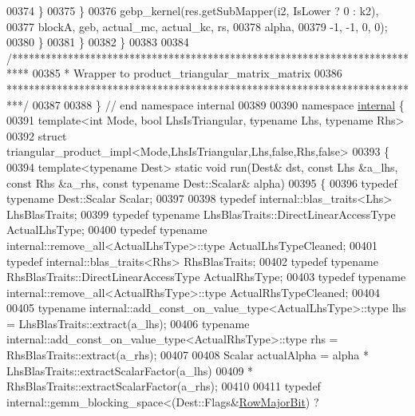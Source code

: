 \begin{DoxyCode}
00374           \}
00375         \}
00376         gebp\_kernel(res.getSubMapper(i2, IsLower ? 0 : k2),
00377                     blockA, geb, actual\_mc, actual\_kc, rs,
00378                     alpha,
00379                     -1, -1, 0, 0);
00380       \}
00381     \}
00382   \}
00383 
00384 \textcolor{comment}{/***************************************************************************}
00385 \textcolor{comment}{* Wrapper to product\_triangular\_matrix\_matrix}
00386 \textcolor{comment}{***************************************************************************/}
00387 
00388 \} \textcolor{comment}{// end namespace internal}
00389 
00390 \textcolor{keyword}{namespace }\hyperlink{namespaceinternal}{internal} \{
00391 \textcolor{keyword}{template}<\textcolor{keywordtype}{int} Mode, \textcolor{keywordtype}{bool} LhsIsTriangular, \textcolor{keyword}{typename} Lhs, \textcolor{keyword}{typename} Rhs>
00392 \textcolor{keyword}{struct }triangular\_product\_impl<Mode,LhsIsTriangular,Lhs,false,Rhs,false>
00393 \{
00394   \textcolor{keyword}{template}<\textcolor{keyword}{typename} Dest> \textcolor{keyword}{static} \textcolor{keywordtype}{void} run(Dest& dst, \textcolor{keyword}{const} Lhs &a\_lhs, \textcolor{keyword}{const} Rhs &a\_rhs, \textcolor{keyword}{const} \textcolor{keyword}{typename} 
      Dest::Scalar& alpha)
00395   \{
00396     \textcolor{keyword}{typedef} \textcolor{keyword}{typename} Dest::Scalar     Scalar;
00397     
00398     \textcolor{keyword}{typedef} internal::blas\_traits<Lhs> LhsBlasTraits;
00399     \textcolor{keyword}{typedef} \textcolor{keyword}{typename} LhsBlasTraits::DirectLinearAccessType ActualLhsType;
00400     \textcolor{keyword}{typedef} \textcolor{keyword}{typename} internal::remove\_all<ActualLhsType>::type ActualLhsTypeCleaned;
00401     \textcolor{keyword}{typedef} internal::blas\_traits<Rhs> RhsBlasTraits;
00402     \textcolor{keyword}{typedef} \textcolor{keyword}{typename} RhsBlasTraits::DirectLinearAccessType ActualRhsType;
00403     \textcolor{keyword}{typedef} \textcolor{keyword}{typename} internal::remove\_all<ActualRhsType>::type ActualRhsTypeCleaned;
00404     
00405     \textcolor{keyword}{typename} internal::add\_const\_on\_value\_type<ActualLhsType>::type lhs = LhsBlasTraits::extract(a\_lhs);
00406     \textcolor{keyword}{typename} internal::add\_const\_on\_value\_type<ActualRhsType>::type rhs = RhsBlasTraits::extract(a\_rhs);
00407 
00408     Scalar actualAlpha = alpha * LhsBlasTraits::extractScalarFactor(a\_lhs)
00409                                * RhsBlasTraits::extractScalarFactor(a\_rhs);
00410 
00411     \textcolor{keyword}{typedef} internal::gemm\_blocking\_space<(Dest::Flags&\hyperlink{group__flags_gae4f56c2a60bbe4bd2e44c5b19cbe8762}{RowMajorBit}) ? 

\end{DoxyCode}
